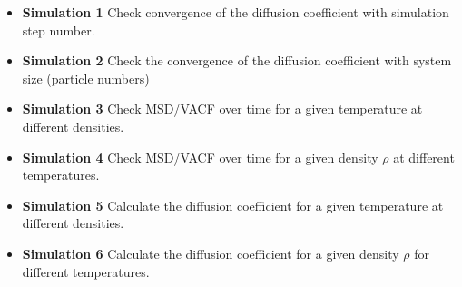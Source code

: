 \documentclass{article}
\begin{document}
\begin{itemize}
    \item {\bf Simulation 1}\newline
    Check convergence of the diffusion coefficient
    with simulation step number.

    \item {\bf Simulation 2}\newline
    Check the convergence of the diffusion coefficient
    with system size (particle numbers)

    \item {\bf Simulation 3}\newline
    Check MSD/VACF over time for a given temperature at different densities.

    \item {\bf Simulation 4}\newline
    Check MSD/VACF over time for a given density $\rho$ at different temperatures.

    \item {\bf Simulation 5}\newline
    Calculate the diffusion coefficient for a given temperature at different densities.

    \item {\bf Simulation 6}\newline
    Calculate the diffusion coefficient for a given density $\rho$ for different temperatures.

\end{itemize}



\end{document}
